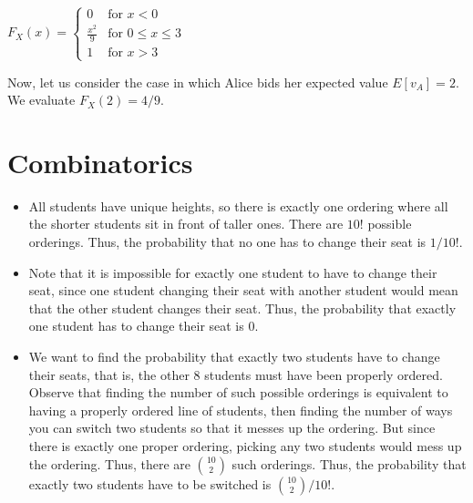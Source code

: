 \documentclass{article}
\begin{document}
$
F_X(x) = \begin{cases}
0 & \text{for } x < 0 \\
\frac{x^2}{9} & \text{for } 0 \leq x \leq 3 \\
1 & \text{for } x > 3
\end{cases}
$

Now, let us consider the case in which Alice bids her expected value $E[v_A]=2$. We evaluate $F_X(2)=4/9$.

\section{Combinatorics}

\begin{itemize}
    \item All students have unique heights, so there is exactly one ordering where all the shorter students sit in front of taller ones. There are $10!$ possible orderings. Thus, the probability that no one has to change their seat is $1/10!$.
    \item Note that it is impossible for exactly one student to have to change their seat, since one student changing their seat with another student would mean that the other student changes their seat. Thus, the probability that exactly one student has to change their seat is 0.
    \item We want to find the probability that exactly two students have to change their seats, that is, the other 8 students must have been properly ordered. Observe that finding the number of such possible orderings is equivalent to having a properly ordered line of students, then finding the number of ways you can switch two students so that it messes up the ordering. But since there is exactly one proper ordering, picking any two students would mess up the ordering. Thus, there are $10 \choose 2$ such orderings. Thus, the probability that exactly two students have to be switched is ${10 \choose 2} / 10!$.
\end{itemize}
\end{document}
